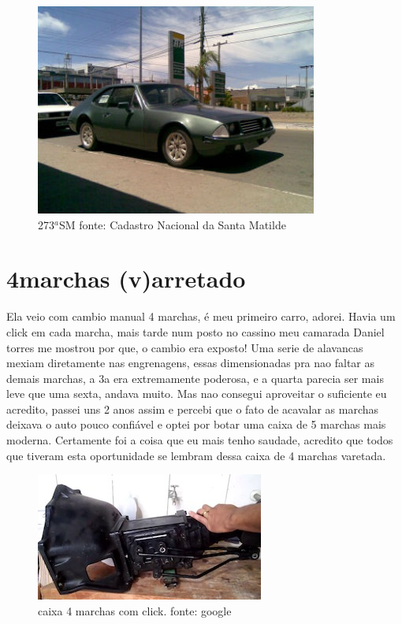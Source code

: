 \documentclass[a4paper]{report}
\begin{document}
\begin{figure}[!htb]
\centering
\includegraphics{sm273}
\caption{273$^{a}$SM fonte: Cadastro Nacional da Santa Matilde}
\label{a 273a SM}
\end{figure}
\clearpage


\section*{4marchas (v)arretado}

Ela veio com cambio manual 4 marchas, \'e meu primeiro carro, adorei. Havia um click em cada marcha,
mais tarde num posto no cassino meu camarada Daniel torres me mostrou por que, o cambio era exposto!
Uma serie de alavancas mexiam diretamente nas engrenagens, essas dimensionadas pra nao faltar as demais 
marchas, a 3a era extremamente poderosa, e a quarta parecia ser mais leve que uma sexta, andava muito. 
Mas nao consegui aproveitar o suficiente eu acredito, passei uns 2 anos assim e percebi que o fato de 
acavalar as marchas deixava o auto pouco confi\'avel e optei por botar uma caixa de 5 marchas mais 
moderna.
Certamente foi a coisa que eu mais tenho saudade, acredito que todos que tiveram esta oportunidade 
se lembram dessa caixa de 4 marchas varetada.

\begin{figure}[!htb]
\centering
\includegraphics{caixa4}
\caption{caixa 4 marchas com click. fonte: google}
\label{4 marchas opala varetada}
\end{figure}
\clearpage
\end{document}
